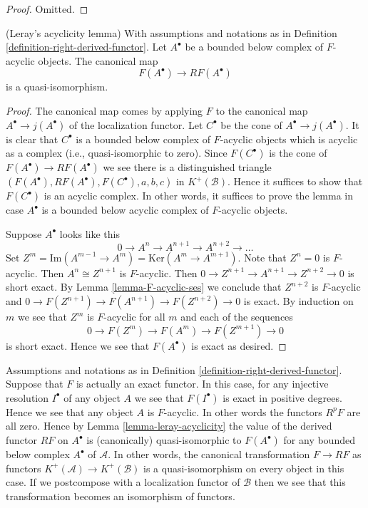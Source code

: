 \begin{proof}
Omitted.
\end{proof}

\begin{lemma}
\label{lemma-leray-acyclicity}
(Leray's acyclicity lemma)
With assumptions and notations as in
Definition \ref{definition-right-derived-functor}.
Let $A^\bullet$ be a bounded below complex of
$F$-acyclic objects. The canonical map
$$
F(A^\bullet) \longrightarrow RF(A^\bullet)
$$
is a quasi-isomorphism.
\end{lemma}

\begin{proof}
The canonical map comes by applying $F$ to the canonical map
$A^\bullet \to j(A^\bullet)$ of the localization functor.
Let $C^\bullet$ be the cone of $A^\bullet \to j(A^\bullet)$.
It is clear that $C^\bullet$ is a bounded below complex of
$F$-acyclic objects which is acyclic as a complex (i.e., quasi-isomorphic
to zero). Since $F(C^\bullet)$ is the cone of
$F(A^\bullet) \to RF(A^\bullet)$ we see there is a distinguished
triangle $(F(A^\bullet), RF(A^\bullet), F(C^\bullet), a, b, c)$
in $K^{+}(\mathcal{B})$. Hence it suffices to show that $F(C^\bullet)$
is an acyclic complex. In other words, it suffices to prove the lemma
in case $A^\bullet$ is a bounded below acyclic complex of $F$-acyclic objects.

\medskip\noindent
Suppose $A^\bullet$ looks like this
$$
0 \to A^n \to A^{n + 1} \to A^{n + 2} \to \ldots
$$
Set
$Z^m = \text{Im}(A^{m - 1} \to A^m) = \text{Ker}(A^m \to A^{m + 1})$.
Note that $Z^n = 0$ is $F$-acyclic. Then $A^n \cong Z^{n + 1}$
is $F$-acyclic. Then $0 \to Z^{n + 1} \to A^{n + 1} \to Z^{n + 2} \to 0$
is short exact. By Lemma \ref{lemma-F-acyclic-ses} we conclude that
$Z^{n + 2}$ is $F$-acyclic and 
$0 \to F(Z^{n + 1}) \to F(A^{n + 1}) \to F(Z^{n + 2}) \to 0$ is exact.
By induction on $m$ we see that $Z^m$ is $F$-acyclic for
all $m$ and each of the sequences
$$
0 \to F(Z^m) \to F(A^m) \to F(Z^{m + 1}) \to 0
$$
is short exact. Hence we see that $F(A^\bullet)$ is exact as desired.
\end{proof}

\begin{remark}
\label{remark-right-derived-exact-functor}
Assumptions and notations as in
Definition \ref{definition-right-derived-functor}.
Suppose that $F$ is actually an exact functor.
In this case, for any injective resolution $I^\bullet$ of any object $A$
we see that $F(I^\bullet)$ is exact in positive degrees.
Hence we see that any object $A$ is $F$-acyclic.
In other words the functors $R^pF$ are all zero.
Hence by Lemma \ref{lemma-leray-acyclicity} the
value of the derived functor $RF$ on $A^\bullet$ is
(canonically) quasi-isomorphic to $F(A^\bullet)$
for any bounded below complex $A^\bullet$ of $\mathcal{A}$.
In other words, the canonical transformation
$F \to RF$ as functors $K^{+}(\mathcal{A}) \to K^{+}(\mathcal{B})$
is a quasi-isomorphism on every object in this case.
If we postcompose with a localization functor of $\mathcal{B}$
then we see that this transformation becomes an isomorphism of functors.
\end{remark}



